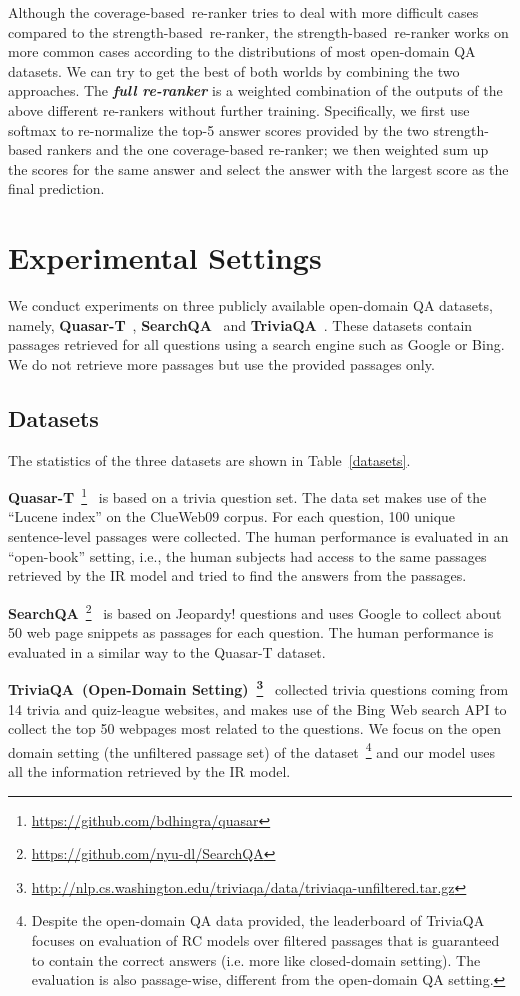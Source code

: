 \documentclass{article} \usepackage{iclr2018_conference,times}
\def \coherence {strength-based}
\def \union {coverage-based}
\begin{document}
Although the \union\ re-ranker tries to deal with more difficult cases compared to the \coherence\ re-ranker, the \coherence\ re-ranker works on more common cases according to the distributions of most open-domain QA datasets. We can try to get the best of both worlds by combining the two approaches. The \textbf{\emph{full re-ranker}} is a weighted combination of the outputs of the above different re-rankers without further training. Specifically, we first use softmax to re-normalize the top-5 answer scores provided by the two strength-based rankers and the one coverage-based re-ranker; we then weighted sum up the scores for the same answer and select the answer with the largest score as the final prediction.
 \section{Experimental Settings}

We conduct experiments on three publicly available open-domain QA datasets, namely, \textbf{Quasar-T}~\citep{dhingra2017quasar}, \textbf{SearchQA}~\citep{dunn2017searchqa} and \textbf{TriviaQA}~\citep{JoshiTriviaQA2017}.
These datasets contain passages retrieved for all questions using a search engine such as Google or Bing. We do not retrieve more passages but use the provided passages only.

\subsection{Datasets}
The statistics of the three datasets are shown in Table~\ref{datasets}.


\textbf{Quasar-T}~\footnote{\url{https://github.com/bdhingra/quasar}}~\citep{dhingra2017quasar} is based on a trivia question set.
The data set makes use of the ``Lucene index'' on the ClueWeb09 corpus. For each question, 100 unique sentence-level passages were collected. 
The human performance is evaluated in an “open-book” setting, i.e., the human subjects had access to the same passages retrieved by the IR model and tried to find the answers from the passages.

\textbf{SearchQA}~\footnote{\url{https://github.com/nyu-dl/SearchQA}}~\citep{dunn2017searchqa}
is based on Jeopardy! questions
and uses Google to collect about 50 web page snippets as passages for each question. The human performance is evaluated in a similar way to the Quasar-T dataset.

\textbf{TriviaQA~(Open-Domain Setting)~\footnote{\url{http://nlp.cs.washington.edu/triviaqa/data/triviaqa-unfiltered.tar.gz}}}~\citep{JoshiTriviaQA2017} collected trivia questions coming from 14 trivia and quiz-league websites, and makes use of the Bing Web search API to collect the top 50 webpages most related to the questions. We focus on the open domain setting (the unfiltered passage set) of the dataset~\footnote{Despite the open-domain QA data provided, the leaderboard of TriviaQA focuses on evaluation of RC models over filtered passages that is guaranteed to contain the correct answers (i.e. more like closed-domain setting). The evaluation is also passage-wise, different from the open-domain QA setting.} and our model uses all the information retrieved by the IR model.
\end{document}
